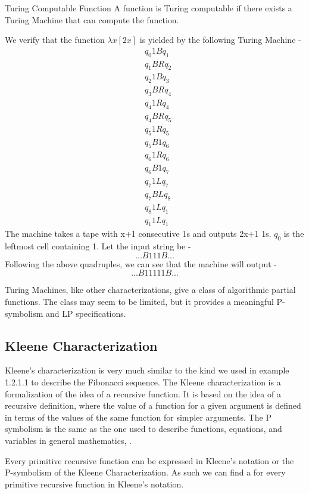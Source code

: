 \documentclass[openany]{book}
\begin{document}
\begin{mydefinition}{Turing Computable Function}
    A function is Turing computable if there exists a Turing Machine that can compute the function.
\end{mydefinition}
\begin{example}
We verify that the function $\lambda x[2x]$ is yielded by the following Turing Machine -  
\begin{align}
    &q_{0}1Bq_1 \\
    &q_{1}BRq_2 \\
    &q_{2}1Bq_3 \\
    &q_{3}BRq_4 \\
    &q_{4}1Rq_4 \\
    &q_{4}BRq_5 \\
    &q_{5}1Rq_5 \\
    &q_{5}B1q_6 \\
    &q_{6}1Rq_6 \\
    &q_{6}B1q_7 \\
    &q_{7}1Lq_7 \\
    &q_{7}BLq_8 \\
    &q_{8}1Lq_1 \\
    &q_{1}1Lq_1
\end{align}
The machine takes a tape with x+1 consecutive 1s and outputs 2x+1 1s. $q_0$ is the leftmost cell containing 1. Let the input string be - \\
$$...B111B...$$
Following the above quadruples, we can see that the machine will output -
$$...B11111B...$$
\end{example}
Turing Machines, like other characterizations, give a class of algorithmic partial functions. The class may seem to be limited, but it provides a meaningful P-symbolism and LP specifications. 
\subsection{Kleene Characterization}
Kleene's characterization is very much similar to the kind we used in example 1.2.1.1 to describe the Fibonacci sequence. The Kleene characterization is a formalization of the idea of a recursive function. It is based on the idea of a recursive definition, where the value of a function for a given argument is defined in terms of the values of the same function for simpler arguments. The P symbolism is the same as the one used to describe functions, equations, and variables in general mathematics, . 
\begin{mynote}
    Every primitive recursive function can be expressed in Kleene's notation or the P-symbolism of the Kleene Characterization. As such we can find a  for every primitive recursive function in Kleene's notation.
\end{mynote}
\end{document}
